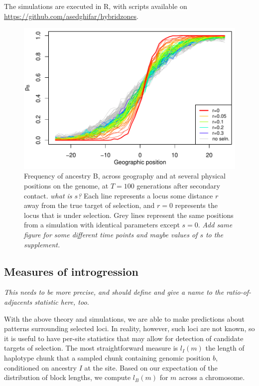 \documentclass[11pt,letterpaper]{article}
\newcommand{\plr}[1]{{\em \color{blue} #1}}
\begin{document}
The simulations are executed in R, with scripts available on
\url{https://github.com/asedghifar/hybridzones}.

\begin{figure}
\includegraphics{figs/alleleFrequencies_sim}
\caption{
Frequency of ancestry B,
across geography and at several physical positions on the genome,
at $T=100$ generations after secondary contact. 
\plr{what is $s$?}
Each line represents a locus some distance $r$ away from the true target of selection, and $r=0$ represents the locus that is under selection. Grey lines represent the same positions from a simulation with
identical parameters except $s=0$.
    \plr{Add same figure for some different time points and maybe values of $s$ to the supplement.} 
}\label{alleleFreq_tau100}
\end{figure}

\subsection*{Measures of introgression}

\plr{This needs to be more precise, and should define and give a name to the ratio-of-adjacents statistic here, too.}

With the above theory and simulations, we are able to make predictions about patterns surrounding selected loci. In reality, however, such loci are not known, so it is useful to have per-site statistics that may allow for detection of candidate targets of selection. The most straightforward measure is $l_I(m)$ the length of haplotype chunk that a sampled chunk containing genomic position $b$, conditioned on ancestry $I$ at the site. Based on our expectation of the distribution of block lengths, we compute $l_B(m)$ for $m$ across a chromosome. 
\end{document}
